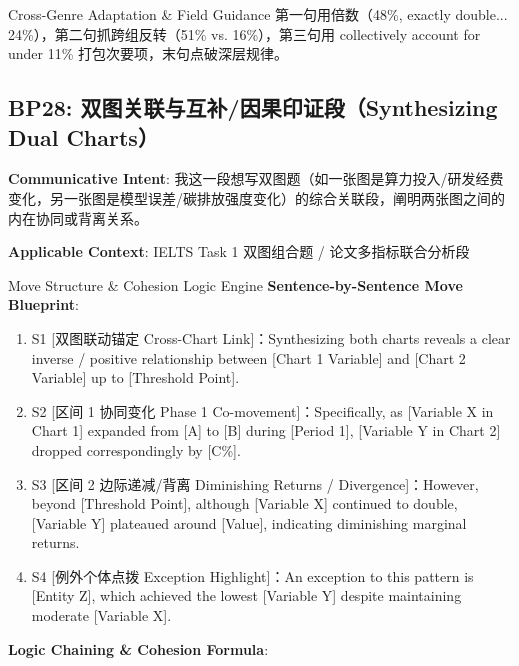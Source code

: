 \endgroup
\vspace{4pt}
\begin{TipBox}{Cross-Genre Adaptation \& Field Guidance}
第一句用倍数（48\%, exactly double... 24\%），第二句抓跨组反转（51\% vs. 16\%），第三句用 collectively account for under 11\% 打包次要项，末句点破深层规律。
\end{TipBox}
\vspace{8pt}
\subsection{BP28: 双图关联与互补/因果印证段（Synthesizing Dual Charts）}\label{sec:bp:BP28}
\noindent\textbf{\color{AcadNavy}Communicative Intent}: 我这一段想写双图题（如一张图是算力投入/研发经费变化，另一张图是模型误差/碳排放强度变化）的综合关联段，阐明两张图之间的内在协同或背离关系。\par\vspace{2pt}
\noindent\textbf{\color{AcadSlate}Applicable Context}: IELTS Task 1 双图组合题 / 论文多指标联合分析段\par\vspace{4pt}
\begin{ConceptBox}{Move Structure \& Cohesion Logic Engine}
\textbf{Sentence-by-Sentence Move Blueprint}:
\begin{enumerate}[label=\textbf{\color{AcadNavy}S\arabic*.}, leftmargin=2em, itemsep=2pt]
  \item S1 [双图联动锚定 Cross-Chart Link]：Synthesizing both charts reveals a clear inverse / positive relationship between [Chart 1 Variable] and [Chart 2 Variable] up to [Threshold Point].
  \item S2 [区间 1 协同变化 Phase 1 Co-movement]：Specifically, as [Variable X in Chart 1] expanded from [A] to [B] during [Period 1], [Variable Y in Chart 2] dropped correspondingly by [C\%].
  \item S3 [区间 2 边际递减/背离 Diminishing Returns / Divergence]：However, beyond [Threshold Point], although [Variable X] continued to double, [Variable Y] plateaued around [Value], indicating diminishing marginal returns.
  \item S4 [例外个体点拨 Exception Highlight]：An exception to this pattern is [Entity Z], which achieved the lowest [Variable Y] despite maintaining moderate [Variable X].
\end{enumerate}\par\vspace{4pt}
\textbf{Logic Chaining \& Cohesion Formula}:\par{}
\end{ConceptBox}
